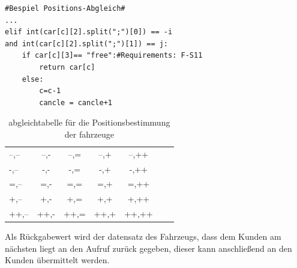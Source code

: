\documentclass[conference]{IEEEtran}
\begin{document}
\begin{lstlisting}
#Bespiel Positions-Abgleich#
...
elif int(car[c][2].split(";")[0]) == -i 
and int(car[c][2].split(";")[1]) == j:
	if car[c][3]== "free":#Requirements: F-S11
    	return car[c]
    else:
        c=c-1
       	cancle = cancle+1
\end{lstlisting}
\begin{table}[h]
\centering
\label{tab.1}
\caption{abgleichtabelle für die Positionsbestimmung der fahrzeuge}
\begin{tabular}{lcccccr}
--,--&--,-&--,=&--,+&--,++\\
-,--&-,-&-,=&-,+&-,++\\
=,--&=,-&=,=&=,+&=,++\\
+,--&+,-&+,=&+,+&+,++\\
++,--&++,-&++,=&++,+&++,++\\
\end{tabular}
\end{table}
Als Rückgabewert wird der datensatz des Fahrzeugs, dass dem Kunden am nächsten liegt an den Aufruf zurück gegeben, dieser kann anschließend an den Kunden übermittelt werden. 
\end{document}
